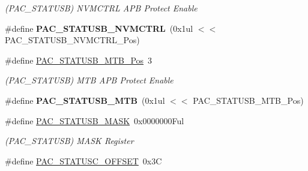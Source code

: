 \begin{DoxyCompactItemize}
\begin{DoxyCompactList}\small\item\em (P\+A\+C\+\_\+\+S\+T\+A\+T\+U\+S\+B) N\+V\+M\+C\+T\+R\+L A\+P\+B Protect Enable \end{DoxyCompactList}\item 
\hypertarget{group___s_a_m_l21___p_a_c_gaaf84cbcedf9278db4290586562bd78e7}{}\#define {\bfseries P\+A\+C\+\_\+\+S\+T\+A\+T\+U\+S\+B\+\_\+\+N\+V\+M\+C\+T\+R\+L}~(0x1ul $<$$<$ P\+A\+C\+\_\+\+S\+T\+A\+T\+U\+S\+B\+\_\+\+N\+V\+M\+C\+T\+R\+L\+\_\+\+Pos)\label{group___s_a_m_l21___p_a_c_gaaf84cbcedf9278db4290586562bd78e7}

\item 
\hypertarget{group___s_a_m_l21___p_a_c_ga2db88b6e70c01b34cf33a953081cd382}{}\#define \hyperlink{group___s_a_m_l21___p_a_c_ga2db88b6e70c01b34cf33a953081cd382}{P\+A\+C\+\_\+\+S\+T\+A\+T\+U\+S\+B\+\_\+\+M\+T\+B\+\_\+\+Pos}~3\label{group___s_a_m_l21___p_a_c_ga2db88b6e70c01b34cf33a953081cd382}

\begin{DoxyCompactList}\small\item\em (P\+A\+C\+\_\+\+S\+T\+A\+T\+U\+S\+B) M\+T\+B A\+P\+B Protect Enable \end{DoxyCompactList}\item 
\hypertarget{group___s_a_m_l21___p_a_c_gac55d2204141fb74e75c0cbd28b21b1e1}{}\#define {\bfseries P\+A\+C\+\_\+\+S\+T\+A\+T\+U\+S\+B\+\_\+\+M\+T\+B}~(0x1ul $<$$<$ P\+A\+C\+\_\+\+S\+T\+A\+T\+U\+S\+B\+\_\+\+M\+T\+B\+\_\+\+Pos)\label{group___s_a_m_l21___p_a_c_gac55d2204141fb74e75c0cbd28b21b1e1}

\item 
\hypertarget{group___s_a_m_l21___p_a_c_ga306c5aba8594220dc52ae9928658e191}{}\#define \hyperlink{group___s_a_m_l21___p_a_c_ga306c5aba8594220dc52ae9928658e191}{P\+A\+C\+\_\+\+S\+T\+A\+T\+U\+S\+B\+\_\+\+M\+A\+S\+K}~0x0000000\+Ful\label{group___s_a_m_l21___p_a_c_ga306c5aba8594220dc52ae9928658e191}

\begin{DoxyCompactList}\small\item\em (P\+A\+C\+\_\+\+S\+T\+A\+T\+U\+S\+B) M\+A\+S\+K Register \end{DoxyCompactList}\item 
\hypertarget{group___s_a_m_l21___p_a_c_gad72799e383707f84a5cebed8f14a808b}{}\#define \hyperlink{group___s_a_m_l21___p_a_c_gad72799e383707f84a5cebed8f14a808b}{P\+A\+C\+\_\+\+S\+T\+A\+T\+U\+S\+C\+\_\+\+O\+F\+F\+S\+E\+T}~0x3\+C\label{group___s_a_m_l21___p_a_c_gad72799e383707f84a5cebed8f14a808b}


\end{DoxyCompactItemize}
